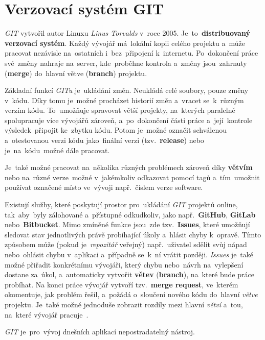 \documentclass[11pt,a4paper]{report}
\begin{document}
        \section{Verzovací systém GIT}
            \emph{GIT} vytvořil autor Linuxu \emph{Linus Torvalds} v~roce 2005. Je~to~\textbf{distribuovaný verzovací systém}. Každý vývojář má~lokální kopii celého projektu a~může pracovat nezávisle na~ostatních i~bez~připojení k~internetu. Po~dokončení práce své~změny nahraje na~server, kde~proběhne kontrola a~změny jsou~zahrnuty (\textbf{merge}) do~hlavní větve (\textbf{branch}) projektu.
            
            Základní funkcí \emph{GITu} je~ukládání změn. Neukládá celé soubory, pouze změny v~kódu. Díky tomu je~možné procházet historií změn a~vracet se~k~různým verzím kódu. To~umožňuje spravovat větší projekty, na~kterých paralelně spolupracuje více vývojářů zároveň, a~po~dokončení části práce a~její~kontrole výsledek~připojit ke~zbytku kódu. Potom je~možné označit schválenou a~otestovanou verzi kódu jako~finální verzi (tzv.~\textbf{release}) nebo je~na~kódu~možné dále pracovat.
            
            Je~také možné pracovat na~několika různých problémech zároveň díky \textbf{větvím} nebo na~různé verze~možné v~jakémkoliv odkazovat pomocí tagů a~tím~umožnit používat označené místo ve~vývoji např.~číslem verze software.

            Existují služby, které poskytují prostor pro~ukládání \emph{GIT} projektů online, tak~aby~byly zálohované a~přístupné odkudkoliv, jako např.~\textbf{GitHub}, \textbf{GitLab} nebo~\textbf{Bitbucket}. Mimo zmíněné funkce jsou~zde tzv.~\textbf{Issues}, které umožňují sledovat stav jednotlivých právě probíhající úkoly a~hlásit chyby k~opravě. Tímto způsobem může (pokud je~\emph{repozitář} veřejný) např.~uživatel sdělit svůj nápad nebo~ohlásit chybu v~aplikaci a~případně se~k~ní vrátit později. \emph{Issues} je~také možné přiřadit konkrétnímu vývojáři, který chybu nebo~návrh na~vylepšení dostane za~úkol, a~automaticky vytvořit \textbf{větev} (\textbf{branch}), na~které bude práce probíhat. Na konci práce vývojář vytvoří tzv.~\textbf{merge request}, ve~kterém okomentuje, jak problém řešil, a~požádá o~sloučení nového kódu do~hlavní \emph{větve} projektu. Je~také možné jednoduše zobrazit rozdíly mezi hlavní \emph{větví} a~tou, na~které vývojář pracuje~\cite{gitscmBook}.
            
            \emph{GIT} je~pro~vývoj dnešních aplikací nepostradatelný nástroj.
            
\end{document}
